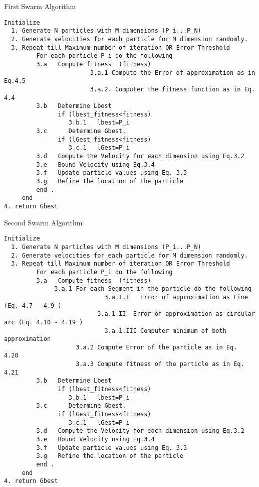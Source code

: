\begin{algorithm}
\caption{ First Swarm Algorithm}
\label{AlgS1alg}
\begin{verbatim}
Initialize 
  1. Generate N particles with M dimensions (P_i...P_N) 
  2. Generate velocities for each particle for M dimension randomly. 
  3. Repeat till Maximum number of iteration OR Error Threshold  
         For each particle P_i do the following 
         3.a   Compute fitness  (fitness) 
         				3.a.1 Compute the Error of approximation as in Eq.4.5
         				3.a.2. Computer the fitness function as in Eq. 4.4 
         3.b   Determine Lbest  
               if (lbest_fitness<fitness)
                  3.b.1   lbest=P_i
         3.c      Determine Gbest.
               if (lGest_fitness<fitness)
                  3.c.1   lGest=P_i
         3.d   Compute the Velocity for each dimension using Eq.3.2 
         3.e   Bound Velocity using Eq.3.4
         3.f   Update particle values using Eq. 3.3
         3.g   Refine the location of the particle 
         end .
     end 
4. return Gbest
\end{verbatim}
\end{algorithm}	
\begin{algorithm}
\caption{ Second Swarm Algorithm}
\label{AlgS2alg}
\begin{verbatim}
Initialize 
  1. Generate N particles with M dimensions (P_i...P_N) 
  2. Generate velocities for each particle for M dimension randomly. 
  3. Repeat till Maximum number of iteration OR Error Threshold  
         For each particle P_i do the following 
         3.a   Compute fitness  (fitness) 
              3.a.1 For each Segment in the particle do the following
         				    3.a.1.I   Error of approximation as Line (Eq. 4.7 - 4.9 )
         			      3.a.1.II  Error of approximation as circular arc (Eq. 4.10 - 4.19 )
         				    3.a.1.III Computer minimum of both approximation 
         			3.a.2 Compute Error of the particle as in Eq.  4.20
         			3.a.3 Compute fitness of the particle as in Eq. 4.21
         3.b   Determine Lbest  
               if (lbest_fitness<fitness)
                  3.b.1   lbest=P_i
         3.c      Determine Gbest.
               if (lGest_fitness<fitness)
                  3.c.1   lGest=P_i
         3.d   Compute the Velocity for each dimension using Eq.3.2 
         3.e   Bound Velocity using Eq.3.4
         3.f   Update particle values using Eq. 3.3
         3.g   Refine the location of the particle 
         end .
     end 
4. return Gbest
\end{verbatim}	
\end{algorithm}	

